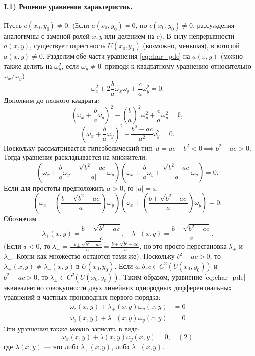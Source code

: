 \documentclass[12pt, a4paper]{article}
\begin{document}
\paragraph{I.1) Решение уравнения характеристик.}
Пусть $a(x_0, y_0) \neq 0$. (Если $a(x_0,y_0)=0$, но $c(x_0,y_0) \neq 0$, рассуждения аналогичны с заменой ролей $x,y$ или делением на $c$).
В силу непрерывности $a(x,y)$, существует окрестность $U(x_0, y_0)$ (возможно, меньшая), в которой $a(x,y) \neq 0$.
Разделим обе части уравнения \eqref{eq:char_pde} на $a(x,y)$ (можно также делить на $\omega_y^2$, если $\omega_y \neq 0$, приводя к квадратному уравнению относительно $\omega_x/\omega_y$):
\[
    \omega_x^2 + 2\frac{b}{a}\omega_x\omega_y + \frac{c}{a}\omega_y^2 = 0.
\]
Дополним до полного квадрата:
\[
    \left(\omega_x + \frac{b}{a}\omega_y\right)^2 - \left(\frac{b}{a}\right)^2\omega_y^2 + \frac{c}{a}\omega_y^2 = 0,
\]
\[
    \left(\omega_x + \frac{b}{a}\omega_y\right)^2 - \frac{b^2-ac}{a^2}\omega_y^2 = 0.
\]
Поскольку рассматривается гиперболический тип, $d = ac-b^2 < 0 \implies b^2-ac > 0$.
Тогда уравнение раскладывается на множители:
\[
    \left( \omega_x + \frac{b}{a}\omega_y - \frac{\sqrt{b^2-ac}}{|a|}\omega_y \right) \left( \omega_x + \frac{b}{a}\omega_y + \frac{\sqrt{b^2-ac}}{|a|}\omega_y \right) = 0.
\]
Если для простоты предположить $a>0$, то $|a|=a$:
\[
    \left( \omega_x + \left(\frac{b - \sqrt{b^2-ac}}{a}\right)\omega_y \right) \left( \omega_x + \left(\frac{b + \sqrt{b^2-ac}}{a}\right)\omega_y \right) = 0.
\]
Обозначим
\[ 
    \lambda_+(x,y) = \frac{b - \sqrt{b^2-ac}}{a}, \quad \lambda_-(x,y) = \frac{b + \sqrt{b^2-ac}}{a}.
\]
(Если $a < 0$, то $\lambda_\pm = \frac{-b \pm \sqrt{b^2-ac}}{-a} = \frac{b \mp \sqrt{b^2-ac}}{a}$, но это просто перестановка $\lambda_+$ и $\lambda_-$. Корни как множество остаются теми же).
Поскольку $b^2-ac > 0$, то $\lambda_+(x,y) \neq \lambda_-(x,y)$ в $U(x_0,y_0)$.
Если $a,b,c \in C^2(U(x_0,y_0))$ и $b^2-ac > 0$, то $\lambda_\pm \in C^2(U(x_0,y_0))$.
Таким образом, уравнение \eqref{eq:char_pde} эквивалентно совокупности двух линейных однородных дифференциальных уравнений в частных производных первого порядка:
\begin{align}
    \omega_x(x,y) + \lambda_+(x,y)\omega_y(x,y) &= 0 \label{eq:char_ode1_pde_form} \\
    \omega_x(x,y) + \lambda_-(x,y)\omega_y(x,y) &= 0 \label{eq:char_ode2_pde_form}
\end{align}
Эти уравнения также можно записать в виде:
\begin{equation} \label{eq:char_pde_factor_generic}
    \omega_x(x,y) + \lambda(x,y)\omega_y(x,y) = 0, \quad (2)
\end{equation}
где $\lambda(x,y)$ --- это либо $\lambda_+(x,y)$, либо $\lambda_-(x,y)$.
\end{document}

